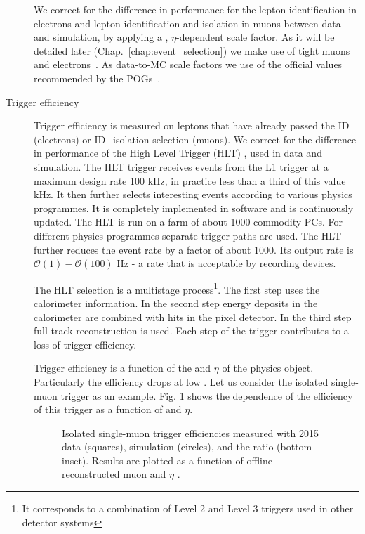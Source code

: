 \begin{description}
We correct for the difference in performance for the lepton identification in electrons and lepton identification and isolation in muons between data and simulation, by applying a \pt, $\eta$-dependent scale factor. As it will be detailed later (Chap.~\ref{chap:event_selection}) we make use of tight muons~\cite{twiki:MUO} and electrons~\cite{twiki:EGM}. As data-to-MC scale factors we use of the official values recommended by the POGs~\cite{twiki:MuonSF,twiki:EGMSF}.


\item[Trigger efficiency]

Trigger efficiency is measured on leptons that have already passed the ID (electrons) or ID+isolation selection (muons). We correct for the difference in performance of the High Level Trigger (HLT) \cite{Adam:2005zf}, \cite{Sphicas:2002gg} used in data and simulation. The HLT trigger receives events from the L1 trigger at a maximum design rate 100 kHz, in practice less than a third of this value kHz. It then further selects interesting events according to various physics programmes. It is completely implemented in software and is continuously updated. The HLT is run on a farm of about 1000 commodity PCs. For different physics programmes separate trigger paths are used. The HLT further reduces the event rate by a factor of about 1000. Its output rate is $\mathcal{O}(1)-\mathcal{O}(100)$ Hz - a rate that is acceptable by recording devices.

The HLT selection is a multistage process\footnote{It corresponds to a combination of Level 2 and Level 3 triggers used in other detector systems}. The first step uses the calorimeter information. In the second step energy deposits in the calorimeter are combined with hits in the pixel detector. In the third step full track reconstruction is used. Each step of the trigger contributes to a loss of trigger efficiency.

Trigger efficiency is a function of the \pt and $\eta$ of the physics object. Particularly the efficiency drops at low \pt. Let us consider the isolated single-muon trigger as an example. Fig. \ref{fig:CMS-MUO-16-001_Figure_008} shows the dependence of the efficiency of this trigger as a function of \pt and $\eta$.

\begin{figure}[htp]
\centering
  \def\twidth{0.45}
  \centering
\caption{Isolated single-muon trigger efficiencies measured with 2015 data (squares), simulation (circles), and the ratio (bottom inset). Results are plotted as a function of offline reconstructed muon \pt and $\eta$ \cite{Sirunyan:2018fpa}.}
\label{fig:CMS-MUO-16-001_Figure_008}
\end{figure}


\end{description}
